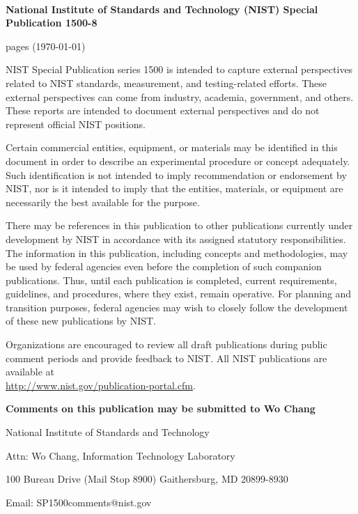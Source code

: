 

\
\begin{center}
{\bf National Institute of Standards and Technology (NIST) Special
  Publication 1500-8}

\pageref{LastPage} pages (\today)
\end{center}

NIST Special Publication series 1500 is intended to capture external
perspectives related to NIST standards, measurement, and
testing-related efforts. These external perspectives can come from
industry, academia, government, and others. These reports are intended
to document external perspectives and do not represent official NIST
positions.

\begin{mdframed}[backgroundcolor=black!5,topline=false,bottomline=false,rightline=false,leftline=false]

  Certain commercial entities, equipment, or materials may be
  identified in this document in order to describe an experimental
  procedure or concept adequately. Such identification is not intended
  to imply recommendation or endorsement by NIST, nor is it intended
  to imply that the entities, materials, or equipment are necessarily
  the best available for the purpose.

  There may be references in this publication to other publications
  currently under development by NIST in accordance with its assigned
  statutory responsibilities. The information in this publication,
  including concepts and methodologies, may be used by federal
  agencies even before the completion of such companion
  publications. Thus, until each publication is completed, current
  requirements, guidelines, and procedures, where they exist, remain
  operative. For planning and transition purposes, federal agencies
  may wish to closely follow the development of these new publications
  by NIST.

  Organizations are encouraged to review all draft publications during
  public comment periods and provide feedback
  to NIST. All NIST publications are available at \\
  \url{http://www.nist.gov/publication-portal.cfm}.

\end{mdframed}

\bigskip \bigskip \bigskip

\begin{center}
{\bf Comments on this publication may be submitted to Wo Chang}
\bigskip

National Institute of Standards and Technology

Attn: Wo Chang, Information Technology Laboratory

100 Bureau Drive (Mail Stop 8900) Gaithersburg, MD 20899-8930

Email: SP1500comments@nist.gov 
\end{center}

\newpage

